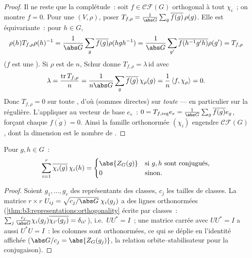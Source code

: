 \begin{proof}
Il ne reste que la complétude~: soit $f \in \mathcal{CF}(G)$
orthogonal à tout $\chi_i$~; on montre $f = 0$. Pour une
 $(V,\rho)$, poser $T_{f,\rho} =
\frac{1}{\abs G} \sum_g \overline{f(g)}\,\rho(g)$. Elle est
équivariante~: pour $h \in G$,
\[
\rho(h)T_{f,\rho}\rho(h)^{-1} = \frac1{\abs G}\sum_g
\overline{f(g)}\rho(hgh^{-1})
= \frac1{\abs G}\sum_{g'}\overline{f(h^{-1}g'h)}\rho(g') =
T_{f,\rho}
\]
($f$ est une ). Si $\rho$ est  de
 $n$, Schur donne $T_{f,\rho} = \lambda\,\mathrm{id}$ avec
\[
\lambda = \frac{\operatorname{tr}T_{f,\rho}}{n}
= \frac{1}{n\abs G}\sum_g \overline{f(g)}\,\chi_\rho(g)
= \frac1n\,\langle f, \chi_\rho\rangle = 0 .
\]
Donc $T_{f,\rho} = 0$ sur toute , d'où (sommes
directes) sur \emph{toute}  --- en particulier
sur la régulière. L'appliquer au vecteur de base $e_e$~: $0 =
T_{f,\mathrm{reg}}e_e = \frac1{\abs
G}\sum_g\overline{f(g)}e_g$, forçant chaque $\overline{f(g)} =
0$. Ainsi la famille orthonormée $(\chi_i)$ engendre
$\mathcal{CF}(G)$, dont la dimension est le nombre de .
\end{proof}

\begin{corollary}
\label{cor:b3:representations:column}
Pour $g, h \in G$~:
\[
\sum_{i=1}^{r}\overline{\chi_i(g)}\,\chi_i(h) =
\begin{cases}
\abs{Z_G(g)} & \text{si } g, h \text{ sont conjugués},\\
0 & \text{sinon.}
\end{cases}
\]
\end{corollary}

\begin{proof}
Soient $g_1, \dots, g_r$ des représentants des classes, $c_j$
les tailles de classes. La matrice $r \times r$ $U_{ij} =
\sqrt{c_j/\abs G}\;\chi_i(g_j)$ a des lignes orthonormées
(\cref{thm:b3:representations:orthogonality} écrite par
classes~: $\sum_j \frac{c_j}{\abs
G}\chi_i(g_j)\overline{\chi_{i'}(g_j)} = \delta_{ii'}$), i.e.\
$UU^* = I$~; une matrice carrée avec $UU^* = I$ a aussi $U^*U =
I$~: les colonnes sont orthonormées, ce qui se déplie en
l'identité affichée ($\abs G/c_j = \abs{Z_G(g_j)}$, la relation
orbite--stabilisateur pour la conjugaison).
\end{proof}

